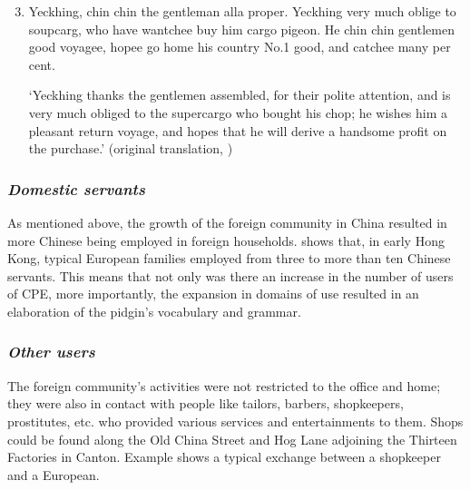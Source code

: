 \documentclass[output=paper]{langsci/langscibook}
\begin{document}
\begin{enumerate}
\setcounter{enumi}{2}\renewcommand{\labelenumi}{$(\theenumi)$}
    \label{(3)}
    \gll\\
        \\
    \glt
    \z

    \item Yeckhing, chin chin the gentleman alla proper. Yeckhing very much oblige to soupcarg, who have wantchee buy him cargo pigeon. He chin chin gentlemen good voyagee, hopee go home his country No.1 good, and catchee many per cent. 

    ‘Yeckhing thanks the gentlemen assembled, for their polite attention, and is very much obliged to the supercargo who bought his chop; he wishes him a pleasant return voyage, and hopes that he will derive a handsome profit on the purchase.’ (original translation, \citealt[126]{tiffany_canton_1849})

\end{enumerate}

\subsubsection{\textit{Domestic servants}}

As mentioned above, the growth of the foreign community in China resulted in more Chinese being employed in foreign households. \citet[309]{zhang_language_2009} shows that, in early Hong Kong, typical European families employed from three to more than ten Chinese servants. This means that not only was there an increase in the number of users of CPE, more importantly, the expansion in domains of use resulted in an elaboration of the pidgin’s vocabulary and grammar.

\subsubsection{\textit{Other users}}

The foreign community’s activities were not restricted to the office and home; they were also in contact with people like tailors, barbers, shopkeepers, prostitutes, etc. who provided various services and entertainments to them. Shops could be found along the Old China Street and Hog Lane adjoining the Thirteen Factories in Canton. Example  shows a typical exchange between a shopkeeper and a European.
\end{document}
